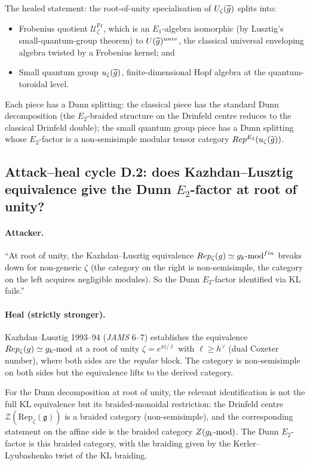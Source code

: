 \documentclass[11pt]{article}
\newcommand{\Eone}{E_{1}}
\newcommand{\Etwo}{E_{2}}
\newcommand{\cU}{\mathcal{U}}
\newcommand{\cZ}{\mathcal{Z}}
\newcommand{\Rep}{\mathrm{Rep}}
\newcommand{\frakg}{\mathfrak{g}}
\begin{document}
The healed statement: the root-of-unity specialisation of
$\cU_\zeta(\widetilde{\widehat\frakg})$ splits into:
\begin{itemize}
\item Frobenius quotient $\cU_\zeta^{\mathrm{Fr}}$, which is an
  $\Eone$-algebra isomorphic (by Lusztig's small-quantum-group theorem)
  to $\cU(\widetilde{\widehat\frakg})^{\mathrm{univ}}$, the classical
  universal enveloping algebra twisted by a Frobenius kernel; and
\item Small quantum group $u_\zeta(\widetilde{\widehat\frakg})$,
  finite-dimensional Hopf algebra at the quantum-toroidal level.
\end{itemize}
Each piece has a Dunn splitting: the classical piece has the standard
Dunn decomposition (the $\Etwo$-braided structure on the Drinfeld
centre reduces to the classical Drinfeld double); the small quantum
group piece has a Dunn splitting whose $\Etwo$-factor is a
non-semisimple modular tensor category
$\Rep^{\Etwo}(u_\zeta(\widetilde{\widehat\frakg}))$.

\subsection{Attack--heal cycle D.2: does Kazhdan--Lusztig equivalence
give the Dunn $\Etwo$-factor at root of unity?}

\paragraph{Attacker.}
``At root of unity, the Kazhdan--Lusztig equivalence $\Rep_\zeta(\frakg)
\simeq \widehat\frakg_k\text{-mod}^{\mathrm{fin}}$ breaks down for
non-generic $\zeta$ (the category on the right is non-semisimple, the
category on the left acquires negligible modules). So the
Dunn $\Etwo$-factor identified via KL fails.''

\paragraph{Heal (strictly stronger).}
Kazhdan--Lusztig 1993--94 (\emph{JAMS} 6--7) establishes the equivalence
$\Rep_\zeta(\frakg) \simeq \widehat\frakg_k\text{-mod}$ at a root of unity
$\zeta = e^{\pi i/\ell}$ with $\ell \geq h^\vee$ (dual Coxeter number),
where both sides are the \emph{regular} block. The category is
non-semisimple on both sides but the equivalence lifts to the derived
category.

For the Dunn decomposition at root of unity, the relevant identification
is not the full KL equivalence but its braided-monoidal restriction:
the Drinfeld centre $\cZ(\Rep_\zeta(\frakg))$ is a braided category
(non-semisimple), and the corresponding statement on the affine side is
the braided category $\cZ(\widehat\frakg_k\text{-mod})$. The Dunn
$\Etwo$-factor is this braided category, with the braiding given by the
Kerler--Lyubashenko twist of the KL braiding.
\end{document}
